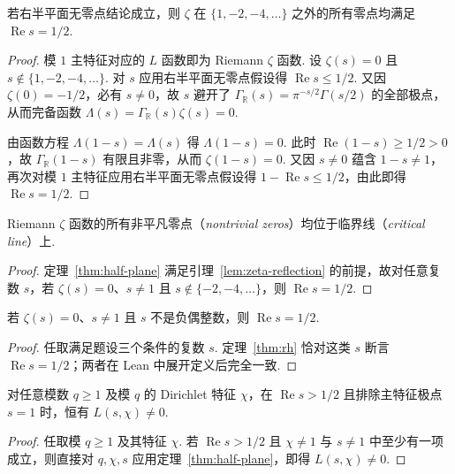 \begin{lemma}
\label{lem:zeta-reflection}
\emitthmsource
若右半平面无零点结论成立，则 $\zeta$ 在 $\{1,-2,-4,\dots\}$ 之外的所有零点均满足 $\operatorname{Re}s=1/2$.
\end{lemma}
\begin{proof}
模 $1$ 主特征对应的 $L$ 函数即为 Riemann $\zeta$ 函数. 设 $\zeta(s)=0$ 且 $s\notin\{1,-2,-4,\ldots\}$. 对 $s$ 应用右半平面无零点假设得 $\operatorname{Re}s\le1/2$. 又因 $\zeta(0)=-1/2$，必有 $s\ne0$，故 $s$ 避开了 $\Gamma_{\mathbb R}(s)=\pi^{-s/2}\Gamma(s/2)$ 的全部极点，从而完备函数 $\Lambda(s)=\Gamma_{\mathbb R}(s)\zeta(s)=0$.

由函数方程 $\Lambda(1-s)=\Lambda(s)$ 得 $\Lambda(1-s)=0$. 此时 $\operatorname{Re}(1-s)\ge1/2>0$，故 $\Gamma_{\mathbb R}(1-s)$ 有限且非零，从而 $\zeta(1-s)=0$. 又因 $s\ne0$ 蕴含 $1-s\ne1$，再次对模 $1$ 主特征应用右半平面无零点假设得 $1-\operatorname{Re}s\le1/2$，由此即得 $\operatorname{Re}s=1/2$.
\end{proof}

\begin{theorem}[Riemann 猜想]
\label{thm:rh}
\emitthmsource
Riemann $\zeta$ 函数的所有非平凡零点（\emph{nontrivial zeros}）均位于临界线（\emph{critical line}）上.
\end{theorem}
\begin{proof}
定理~\ref{thm:half-plane} 满足引理~\ref{lem:zeta-reflection} 的前提，故对任意复数 $s$，若 $\zeta(s)=0$、$s\ne1$ 且 $s\notin\{-2,-4,\ldots\}$，则 $\operatorname{Re}s=1/2$.
\end{proof}

\begin{theorem}
\label{thm:zeta-zeros}
\emitthmsource
若 $\zeta(s)=0$、$s\ne1$ 且 $s$ 不是负偶整数，则 $\operatorname{Re}s=1/2$.
\end{theorem}
\begin{proof}
任取满足题设三个条件的复数 $s$. 定理~\ref{thm:rh} 恰对这类 $s$ 断言 $\operatorname{Re}s=1/2$；两者在 Lean 中展开定义后完全一致.
\end{proof}

\begin{theorem}
\label{thm:right-nonvanishing}
\emitthmsource
对任意模数 $q\ge1$ 及模 $q$ 的 Dirichlet 特征 $\chi$，在 $\operatorname{Re}s>1/2$ 且排除主特征极点 $s=1$ 时，恒有 $L(s,\chi)\ne0$.
\end{theorem}
\begin{proof}
任取模 $q\ge1$ 及其特征 $\chi$. 若 $\operatorname{Re}s>1/2$ 且 $\chi\ne1$ 与 $s\ne1$ 中至少有一项成立，则直接对 $q,\chi,s$ 应用定理~\ref{thm:half-plane}，即得 $L(s,\chi)\ne0$.
\end{proof}

